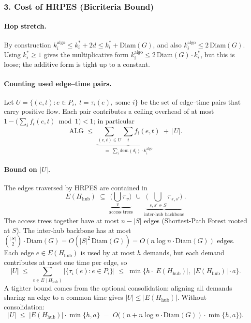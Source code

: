 \documentclass[12pt, a4paper]{article}
\begin{document}
\subsubsection*{3. Cost of HRPES (Bicriteria Bound)}

\paragraph{Hop stretch.}
By construction $k_i^{\mathrm{algo}}\le k_i^*+2d \le k_i^*+\mathrm{Diam}(G)$, and also $k_i^{\mathrm{algo}}\le 2\,\mathrm{Diam}(G)$. Using $k_i^*\ge 1$ gives the multiplicative form $k_i^{\mathrm{algo}}\le 2\,\mathrm{Diam}(G)\cdot k_i^*$, but this is loose; the additive form is tight up to a constant.

\paragraph{Counting used edge--time pairs.}
Let $U=\bigl\{(e,t):e\in P_i,\;t=\tau_i(e),\;\text{some }i\bigr\}$ be the set of edge--time pairs that carry positive flow. Each pair contributes a ceiling overhead of at most $1-\bigl(\sum_i f_i(e,t)\bmod 1\bigr) < 1$; in particular
\[
\mathrm{ALG} \;\le\; \underbrace{\sum_{(e,t)\in U}\sum_i f_i(e,t)}_{=\;\sum_i \mathrm{dem}(d_i)\cdot k_i^{\mathrm{algo}}} \;+\; |U|.
\]

\paragraph{Bound on $|U|$.}
The edges traversed by HRPES are contained in
\[
E(H_\mathrm{hub}) \;\subseteq\; \underbrace{\bigl(\bigcup_v \pi_v\bigr)}_{\text{access trees}} \;\cup\; \underbrace{\bigl(\bigcup_{s,s'\in S}\pi_{s,s'}\bigr)}_{\text{inter-hub backbone}}.
\]
The access trees together have at most $n-|S|$ edges (Shortest-Path Forest rooted at $S$). The inter-hub backbone has at most $\binom{|S|}{2}\cdot\mathrm{Diam}(G)=O(|S|^2\,\mathrm{Diam}(G))=O(n\log n\cdot\mathrm{Diam}(G))$ edges. Each edge $e\in E(H_\mathrm{hub})$ is used by at most $h$ demands, but each demand contributes at most one time per edge, so
\[
|U|\;\le\;\sum_{e\in E(H_\mathrm{hub})}\bigl|\{\tau_i(e):e\in P_i\}\bigr|\;\le\;\min\bigl\{h\cdot|E(H_\mathrm{hub})|,\;|E(H_\mathrm{hub})|\cdot a\bigr\}.
\]
A tighter bound comes from the optional consolidation: aligning all demands sharing an edge to a common time gives $|U|\le|E(H_\mathrm{hub})|$. Without consolidation:
\[
|U|\;\le\;|E(H_\mathrm{hub})|\cdot \min\{h,a\}\;=\;O\bigl((n+n\log n\cdot\mathrm{Diam}(G))\cdot\min\{h,a\}\bigr).
\]
\end{document}
